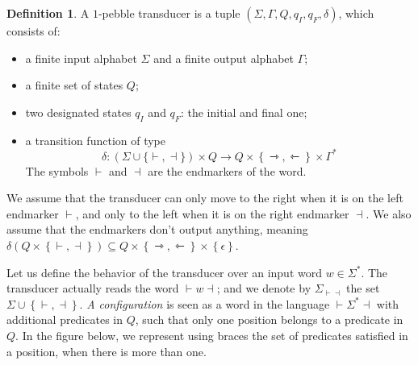 \documentclass{article}
\newcommand{\set}[1]{\left\{#1 \right\}}
\newcommand{\mleft}{\leftarrowtriangle}
\newcommand{\mright}{\rightarrowtriangle}
\theoremstyle{definition}
\newtheorem{definition}[theorem]{Definition}
\theoremstyle{remark}
\begin{document}
\begin{center}


\end{center}

\begin{definition}\label{def:1pebble}
A $1$-pebble transducer is a tuple $(\Sigma,\Gamma, Q, q_I, q_F, \delta)$, which consists of:
\begin{itemize}
\item a finite input alphabet $\Sigma$ and a finite output alphabet $\Gamma$; 
\item a finite set of states $Q$;
\item two designated states $q_I$ and $q_F$: the initial and final one;
\item  a transition function of type 
$$\delta : (\Sigma\cup\{\vdash,\dashv\}) \times Q \to Q\times\set{\mright,\mleft}\times\Gamma^*$$
The symbols  $\vdash$ and $\dashv$ are the endmarkers of the word. 
\end{itemize}
We assume that the transducer can only move to the right when it is on the left endmarker $\vdash$, and only to the left when  it is on the right endmarker $\dashv$. We also assume that the endmarkers don't output anything, meaning  $\delta(Q\times\set{\vdash,\dashv})\subseteq Q\times\set{\mright,\mleft}\times \set{\epsilon}$.
 \end{definition}


Let us define the behavior of the transducer over an input word $w\in\Sigma^*$.
The transducer actually reads the word ${\vdash} w{\dashv}$; and we denote by $\Sigma_{\vdash\dashv}$ the set  $\Sigma\cup\set{\vdash,\dashv}$.
\emph{A configuration} is seen as a word in the language ${\vdash}\Sigma^*{\dashv}$ with additional predicates in $Q$, such that only one position belongs to a predicate in $Q$. In the figure below, we represent using braces the set of predicates satisfied in a position, when there is more than one.
\end{document}
